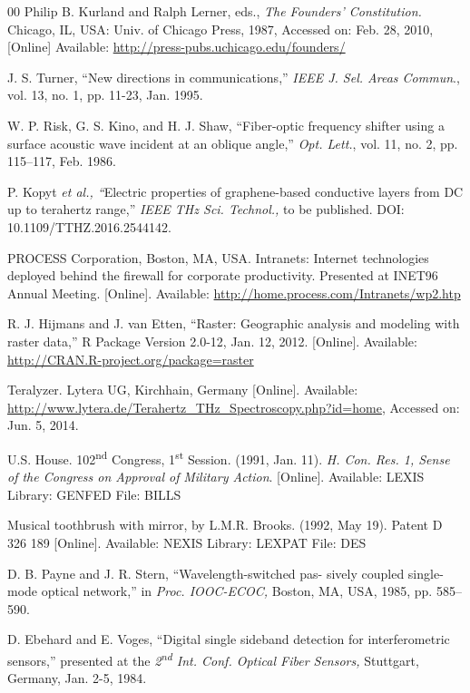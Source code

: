 \documentclass{ieeeaccess}
\begin{document}
\begin{thebibliography}{00}
 Philip B. Kurland and Ralph Lerner, eds., \emph{The
Founders' Constitution.} Chicago, IL, USA: Univ. of Chicago Press,
1987, Accessed on: Feb. 28, 2010, [Online] Available:
\underline{http://press-pubs.uchicago.edu/founders/}

 J. S. Turner, ``New directions in communications,'' \emph{IEEE J. Sel. Areas Commun}., vol. 13, no. 1, pp. 11-23, Jan. 1995.

 W. P. Risk, G. S. Kino, and H. J. Shaw, ``Fiber-optic frequency shifter using a surface acoustic wave incident at an oblique angle,'' \emph{Opt. Lett.}, vol. 11, no. 2, pp. 115--117, Feb. 1986.

 P. Kopyt \emph{et al., ``}Electric properties of graphene-based conductive layers from DC up to terahertz range,'' \emph{IEEE THz Sci. Technol.,} to be published. DOI: 10.1109/TTHZ.2016.2544142.

 PROCESS Corporation, Boston, MA, USA. Intranets:
Internet technologies deployed behind the firewall for corporate
productivity. Presented at INET96 Annual Meeting. [Online].
Available: \underline{http://home.process.com/Intranets/wp2.htp}

 R. J. Hijmans and J. van Etten, ``Raster: Geographic analysis and modeling with raster data,'' R Package Version 2.0-12, Jan. 12, 2012. [Online]. Available: \underline {http://CRAN.R-project.org/package=raster}

 Teralyzer. Lytera UG, Kirchhain, Germany [Online].
Available:
\underline{http://www.lytera.de/Terahertz\_THz\_Spectroscopy.php?id=home}, Accessed on: Jun. 5, 2014.

 U.S. House. 102\textsuperscript{nd} Congress, 1\textsuperscript{st} Session. (1991, Jan. 11). \emph{H. Con. Res. 1, Sense of the Congress on Approval of}  \emph{Military Action}. [Online]. Available: LEXIS Library: GENFED File: BILLS

 Musical toothbrush with mirror, by L.M.R. Brooks. (1992, May 19). Patent D 326 189 [Online]. Available: NEXIS Library: LEXPAT File: DES

 D. B. Payne and J. R. Stern, ``Wavelength-switched pas- sively coupled single-mode optical network,'' in \emph{Proc. IOOC-ECOC,} Boston, MA, USA, 1985, pp. 585--590.

 D. Ebehard and E. Voges, ``Digital single sideband detection for interferometric sensors,'' presented at the \emph{2\textsuperscript{nd} Int. Conf. Optical Fiber Sensors,} Stuttgart, Germany, Jan. 2-5, 1984.


\end{thebibliography}
\end{document}
